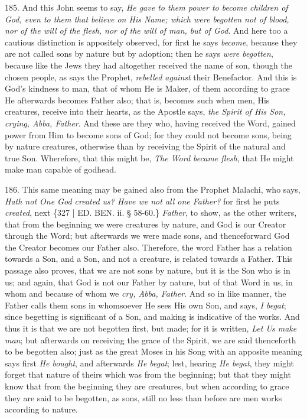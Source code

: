 185. And this John seems to
say, \emph{He gave to them power to become children of God, even to them
that believe on His Name; which were begotten not of blood, nor of the
will of the flesh, nor of the will of man, but of God}. And here
too a cautious distinction is appositely observed, for first he says \emph{become},
because they are not called sons by nature but by adoption; then he
says \emph{were begotten}, because like the Jews they had altogether
received the name of son, though the chosen people, as says the
Prophet, \emph{rebelled against} their Benefactor. And this is God's
kindness to man, that of whom He is Maker, of them according to grace
He afterwards becomes Father also; that is, becomes such when men, His
creatures, receive into their hearts, as the Apostle says, \emph{the
Spirit of His Son, crying, Abba, Father}. And these are they who,
having received the Word, gained power from Him to become sons of God;
for they could not become sons, being by nature creatures, otherwise
than by receiving the Spirit of the natural and true Son. Wherefore,
that this might be, \emph{The Word became flesh}, that He might make
man capable of godhead.

186. This same meaning may be
gained also from the Prophet Malachi, who says, \emph{Hath not One God
created us? Have we not all one Father?} for first he puts \emph{created},
next \{327 | ED.
BEN. ii. § 58-60.\} \emph{Father}, to show, as
the other writers, that from the beginning we were creatures by
nature, and God is our Creator through the Word; but afterwards we
were made sons, and thenceforward God the Creator becomes our Father
also. Therefore, the word Father has a relation towards a Son, and a
Son, and not a creature, is related towards a Father. This passage
also proves, that we are not sons by nature, but it is the Son who is
in us; and again, that God is not our Father by nature, but of that
Word in us, in whom and because of whom we \emph{cry, Abba, Father}.
And so in like manner, the Father calls them sons in whomsoever He
sees His own Son, and says, \emph{I begat}; since begetting is
significant of a Son, and making is indicative of the works. And thus
it is that we are not begotten first, but made; for it is written, \emph{Let
Us make man}; but afterwards on receiving the grace of the Spirit,
we are said thenceforth to be begotten also; just as the great Moses
in his Song with an apposite meaning says first \emph{He bought}, and
afterwards \emph{He begat}; lest, hearing \emph{He begat}, they might
forget that nature of theirs which was from the beginning; but that
they might know that from the beginning they are creatures, but when
according to grace they are said to be begotten, as sons, still no
less than before are men works according to nature.

